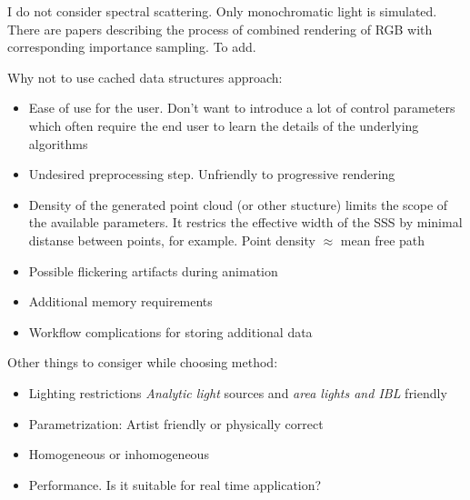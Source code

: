 I do not consider spectral scattering. Only monochromatic light is simulated.
There are papers describing the process of combined rendering of RGB with
corresponding importance sampling. To add.

Why not to use cached data structures approach:
\begin{itemize}
    \item{Ease of use for the user. Don't want to introduce a lot of control
    parameters which often require the end user to learn the details of the
    underlying algorithms}
    \item{Undesired preprocessing step. Unfriendly to progressive rendering}
    \item{Density of the generated point cloud (or other stucture) limits the
    scope of the available parameters. It restrics the effective width of the
    SSS by minimal distanse between points, for example. Point density $\approx$
    mean free path}
    \item{Possible flickering artifacts during animation}
    \item{Additional memory requirements}
    \item{Workflow complications for storing additional data}
\end{itemize}

Other things to consiger while choosing method:
\begin{itemize}
  \item Lighting restrictions \emph{Analytic light} sources and \emph{area lights and IBL} friendly
  \item Parametrization: Artist friendly or physically correct
  \item Homogeneous or inhomogeneous
  \item Performance. Is it suitable for real time application?
\end{itemize}